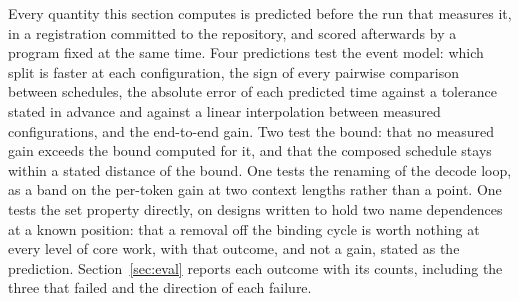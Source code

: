 Every quantity this section computes is predicted before the run that measures it, in a registration committed to the repository, and scored afterwards by a program fixed at the same time.
Four predictions test the event model: which split is faster at each configuration, the sign of every pairwise comparison between schedules, the absolute error of each predicted time against a tolerance stated in advance and against a linear interpolation between measured configurations, and the end-to-end gain.
Two test the bound: that no measured gain exceeds the bound computed for it, and that the composed schedule stays within a stated distance of the bound.
One tests the renaming of the decode loop, as a band on the per-token gain at two context lengths rather than a point.
One tests the set property directly, on designs written to hold two name dependences at a known position: that a removal off the binding cycle is worth nothing at every level of core work, with that outcome, and not a gain, stated as the prediction.
Section~\ref{sec:eval} reports each outcome with its counts, including the three that failed and the direction of each failure.
